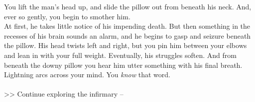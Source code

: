 You lift the man's head up, and slide the pillow out from beneath his neck. And, ever so gently, you begin to smother him.\\

At first, he takes little notice of his impending death. But then something in the recesses of his brain sounds an alarm, and he begins to gasp and seizure beneath the pillow. His head twists left and right, but you pin him between your elbows and lean in with your full weight. Eventually, his struggles soften. And from beneath the downy pillow you hear him utter something with his final breath.\\

Lightning arcs across your mind. You \emph{know} that word.\\
\\

>> Continue exploring the infirmary -- 